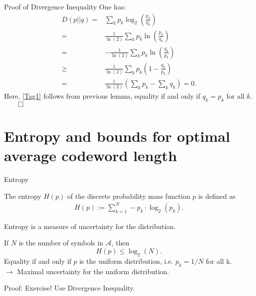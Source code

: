 \begin{frame}{Proof of Divergence Inequality}
One has: 
\begin{align*}
D(p||q)=&\sum_kp_k\log_2\left(\frac{p_k}{q_k}\right)\\
=&\frac{1}{\ln(2)}\sum_kp_k\ln\left(\frac{p_k}{q_k}\right)\\
=&-\frac{1}{\ln(2)}\sum_kp_k\ln\left(\frac{q_k}{p_k}\right)\\
\geq & \frac{1}{\ln(2)}\sum_kp_k\left(1-\frac{q_k}{p_k}\right) \tag {+}\label{Tag1}\\
=&\frac{1}{\ln(2)}\left(\sum_kp_k-\sum_kq_k\right)=0.
\end{align*}
Here, \eqref{Tag1} follows from previous lemma, equality if and only if $q_k=p_k$ for all $k$. $\qed$
\end{frame}

\section{Entropy and bounds for optimal average codeword length}
\begin{frame}{Entropy} 
\begin{definition}
The entropy $H(p)$ of the discrete probability mass function $p$ is defined as
\begin{align*}
H(p):=\sum_{k=1}^N-p_k\cdot \log_2(p_k).
\end{align*}
\end{definition}
\bit 
\item Entropy is a measure of uncertainty for the distribution. 
\item If $N$ is the number of symbols in $\mathcal{A}$, then 
\[ 
H(p)\leq \log_2(N).
\] 
Equality if and only if $p$ is the uniform distribution, 
i.e. $p_k=1/N$ for all k.\\ $\rightarrow$ Maximal uncertainty for the uniform distribution. 
\item Proof: Exercise! Use Divergence Inequality.
\eit
\smallskip
{}  
\end{frame}



